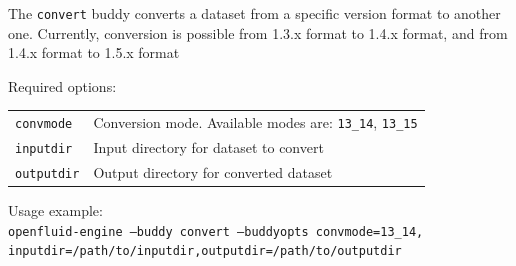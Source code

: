The \texttt{convert} buddy converts a dataset from a specific version format to another one.
Currently, conversion is possible from 1.3.x format to 1.4.x format, and from 1.4.x format to 1.5.x format 

\bigskip

\noindent Required options:
\begin{center}
\begin{tabularx}{\linewidth}{lX} 
\texttt{convmode}&Conversion mode. Available modes are: \texttt{13\_14}, \texttt{13\_15}\\
\texttt{inputdir}&Input directory for dataset to convert\\ 
\texttt{outputdir}&Output directory for converted dataset\\
\end{tabularx}
\end{center}

\bigskip

\noindent Usage example:\\
\texttt{openfluid-engine --buddy convert --buddyopts convmode=13\_14,
inputdir=/path/to/inputdir,outputdir=/path/to/outputdir}


